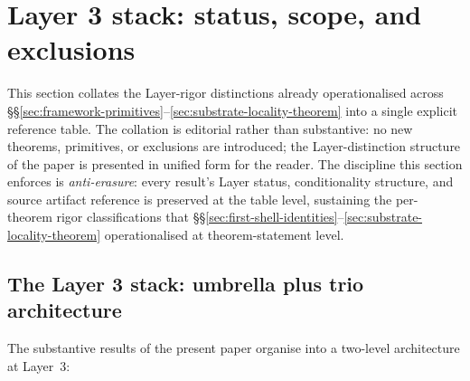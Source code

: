\documentclass[11pt,letterpaper]{article}
\begin{document}
\section{Layer 3 stack: status, scope, and exclusions}
\label{sec:layer3-stack}


This section collates the Layer-rigor distinctions already operationalised across \S\S\ref{sec:framework-primitives}--\ref{sec:substrate-locality-theorem} into a single explicit reference table. The collation is editorial rather than substantive: no new theorems, primitives, or exclusions are introduced; the Layer-distinction structure of the paper is presented in unified form for the reader. The discipline this section enforces is \emph{anti-erasure}: every result's Layer status, conditionality structure, and source artifact reference is preserved at the table level, sustaining the per-theorem rigor classifications that \S\S\ref{sec:first-shell-identities}--\ref{sec:substrate-locality-theorem} operationalised at theorem-statement level.

\subsection{The Layer 3 stack: umbrella plus trio architecture}
\label{sec:layer3-stack-overview}

The substantive results of the present paper organise into a two-level architecture at Layer~3:
\end{document}
